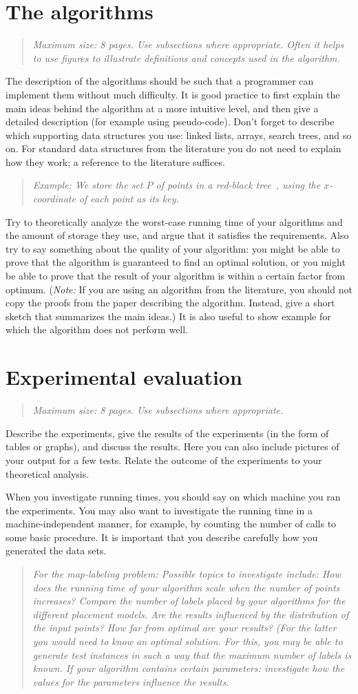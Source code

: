\documentclass[11pt]{article}
\newcommand{\maxsize}[1]{\begin{quotation} {\sl \noindent Maximum size: #1.} \end{quotation}}
\newcommand{\ml}[1]{\begin{quotation} {\sl \noindent For the map-labeling problem: #1} \end{quotation}}
\newcommand{\example}[1]{\begin{quotation} {\sl \noindent Example: #1} \end{quotation}}
\begin{document}
\section{The algorithms}
\label{se:algorithms}
\maxsize{8 pages. Use subsections where appropriate. Often it helps to use figures
to illustrate definitions and concepts used in the algorithm}
%
The description of the algorithms should be such that a programmer can
implement them without much difficulty. It is good practice to first explain the
main ideas behind the algorithm at a more intuitive level, and then give a
detailed description (for example using pseudo-code).
Don't forget to describe which supporting data structures you use:
linked lists, arrays, search trees, and so on. For standard data structures
from the literature you do not need to explain how they work; a reference
to the literature suffices.
%
\example{We store the set $P$ of points in a red-black tree~\cite{clrs-ia-01},
         using the $x$-coordinate of each point as its key.}
%
Try to theoretically analyze the worst-case running time of your algorithms
and the amount of storage they use, and argue that it satisfies the requirements.
Also try to say something about the quality of your algorithm: you might be able to prove that the algorithm is guaranteed to find an optimal solution, or
you might be able to prove that the result of your algorithm is within a certain factor
from optimum. (\emph{Note:} If you are using an algorithm from the literature, you should not
copy the proofs from the paper describing the algorithm. Instead, give a short sketch that
summarizes the main ideas.)
It is also useful to show example for which the algorithm does not
perform well.


\section{Experimental evaluation}
\label{se:evaluation}
\maxsize{8 pages. Use subsections where appropriate}
Describe the experiments, give the results of the experiments (in the form of tables or graphs),
and discuss the results. Here you can also include pictures of your output for a few tests.
Relate the outcome of the experiments to your theoretical analysis.

When you investigate running times, you should say on which machine you ran the experiments.
You may also want to investigate the running time in a  machine-independent manner,
for example, by counting the number of calls to some basic procedure.
It is important that you describe carefully how you generated the data sets.
\ml{Possible topics to investigate include: How does the running time of your algorithm
scale when the number of points increases? Compare the number of labels placed by
your algorithms for the different placement models. Are the results influenced by the
distribution of the input points? How far from optimal are your results? (For the latter you
would need to know an optimal solution. For this, you may be able to generate test instances in
such a way that the maximum number of labels is known. If your algorithm contains certain
parameters: investigate how the values for the parameters influence the results.}
\end{document}
